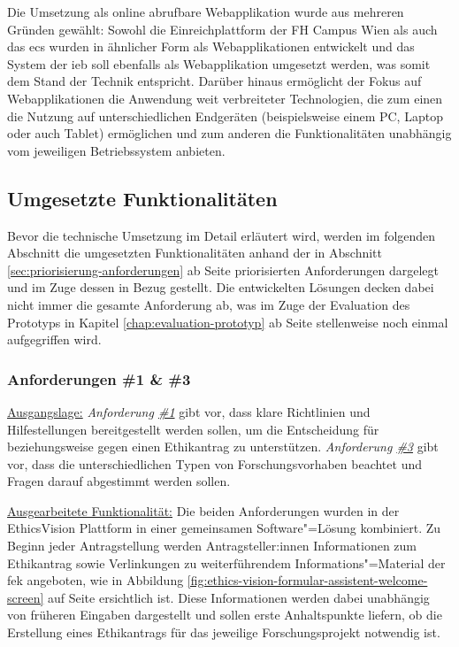 \documentclass[a4paper,12pt,twoside,numbers=noendperiod]{scrreprt}
\begin{document}
Die Umsetzung als online abrufbare Webapplikation wurde aus mehreren Gründen gewählt: Sowohl die Einreichplattform der FH Campus Wien als auch das \acl{ecs} wurden in ähnlicher Form als Webapplikationen entwickelt und das System der \ac{ieb} soll ebenfalls als Webapplikation umgesetzt werden, was somit dem Stand der Technik entspricht. Darüber hinaus ermöglicht der Fokus auf Webapplikationen die Anwendung weit verbreiteter Technologien, die zum einen die Nutzung auf unterschiedlichen Endgeräten (beispielsweise einem PC, Laptop oder auch Tablet) ermöglichen und zum anderen die Funktionalitäten unabhängig vom jeweiligen Betriebssystem anbieten.

\subsection{Umgesetzte Funktionalitäten}
\label{sub-sec:umgesetzte-funtionalitäten}

Bevor die technische Umsetzung im Detail erläutert wird, werden im folgenden Abschnitt die umgesetzten Funktionalitäten anhand der in Abschnitt \ref{sec:priorisierung-anforderungen} ab Seite \pageref{sec:priorisierung-anforderungen} priorisierten Anforderungen dargelegt und im Zuge dessen in Bezug gestellt. Die entwickelten Lösungen decken dabei nicht immer die gesamte Anforderung ab, was im Zuge der Evaluation des Prototyps in Kapitel \ref{chap:evaluation-prototyp} ab Seite \pageref{chap:evaluation-prototyp} stellenweise noch einmal aufgegriffen wird.

\subsubsection*{Anforderungen \#1 \& \#3}
\label{sub-sub-sec:umgesetzte-funktionalitäten-anforderung-1-3}

\underline{Ausgangslage:} \textit{Anforderung \hyperref[sub-sub-sec:abgeleitete-anforderungen-vorfeld-antrag]{\#1}} gibt vor, dass klare Richtlinien und Hilfestellungen bereitgestellt werden sollen, um die Entscheidung für beziehungsweise gegen einen Ethikantrag zu unterstützen. \textit{Anforderung \hyperref[sub-sub-sec:abgeleitete-anforderungen-während-erstellung-einreichung]{\#3}} gibt vor, dass die unterschiedlichen Typen von Forschungsvorhaben beachtet und Fragen darauf abgestimmt werden sollen.

\medskip

\noindent\underline{Ausgearbeitete Funktionalität:} Die beiden Anforderungen wurden in der EthicsVision Plattform in einer gemeinsamen Software"=Lösung kombiniert. Zu Beginn jeder Antragstellung werden Antragsteller:innen Informationen zum Ethikantrag sowie Verlinkungen zu weiterführendem Informations"=Material der \ac{fek} angeboten, wie in Abbildung \ref{fig:ethics-vision-formular-assistent-welcome-screen} auf Seite \pageref{fig:ethics-vision-formular-assistent-welcome-screen} ersichtlich ist. Diese Informationen werden dabei unabhängig von früheren Eingaben dargestellt und sollen erste Anhaltspunkte liefern, ob die Erstellung eines Ethikantrags für das jeweilige Forschungsprojekt notwendig ist.
\end{document}
